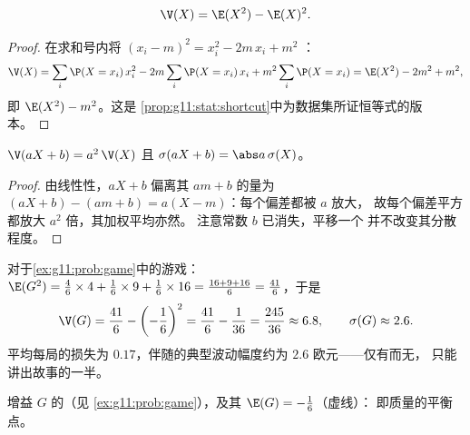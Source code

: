 \begin{proposition}[简便公式]\label{prop:g11:prob:konig}
\[
\V(X) = \E(X^2) - \E(X)^2 .
\]
\end{proposition}

\begin{proof}
在求和号内将 $(x_i - m)^2 = x_i^2 - 2m\,x_i + m^2$ ：
\[
\V(X) = \sum_i \P(X = x_i)\,x_i^2
- 2m \sum_i \P(X = x_i)\,x_i + m^2\sum_i \P(X = x_i)
= \E(X^2) - 2m^2 + m^2 ,
\]
即 $\E(X^2) - m^2$。这是
\cref{prop:g11:stat:shortcut}中为数据集所证恒等式的版本。
\end{proof}

\begin{proposition}[仿射变换]\label{prop:g11:prob:affine}
$\V(aX + b) = a^2\,\V(X)$ 且 $\sigma(aX + b) = \abs a\,\sigma(X)$。
\end{proposition}

\begin{proof}
由线性性，$aX + b$ 偏离其 $a m + b$ 的量为
$(aX + b) - (am + b) = a(X - m)$：每个偏差都被 $a$ 放大，
故每个偏差平方都放大 $a^2$ 倍，其加权平均亦然。
注意常数 $b$ 已消失，平移一个
并不改变其分散程度。
\end{proof}

\begin{example}\label{ex:g11:prob:variance}
对于\cref{ex:g11:prob:game}中的游戏：
$\E(G^2) = \frac46 \times 4 + \frac16 \times 9 + \frac16 \times 16
= \frac{16 + 9 + 16}{6} = \frac{41}{6}$，于是
\[
\V(G) = \frac{41}{6} - \left(-\frac16\right)^2
= \frac{41}{6} - \frac{1}{36} = \frac{245}{36} \approx 6.8,
\qquad
\sigma(G) \approx 2.6 .
\]
平均每局的损失为 $0.17$，伴随的典型波动幅度约为
$2.6$ 欧元——仅有而无，
只能讲出故事的一半。
\end{example}

\begin{omfigure}

{\small 增益 $G$ 的（见
\cref{ex:g11:prob:game}），及其 $\E(G) = -\frac16$（虚线）：
即质量的平衡点。}
\end{omfigure}

